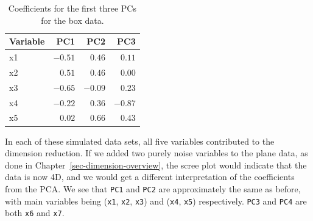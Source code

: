 \documentclass[
  letterpaper,
]{krantz}
\newenvironment{Shaded}{\begin{snugshade}}{\end{snugshade}}
\newcommand{\AttributeTok}[1]{\textcolor[rgb]{0.40,0.45,0.13}{#1}}
\newcommand{\ControlFlowTok}[1]{\textcolor[rgb]{0.00,0.23,0.31}{#1}}
\newcommand{\DecValTok}[1]{\textcolor[rgb]{0.68,0.00,0.00}{#1}}
\newcommand{\FunctionTok}[1]{\textcolor[rgb]{0.28,0.35,0.67}{#1}}
\newcommand{\NormalTok}[1]{\textcolor[rgb]{0.00,0.23,0.31}{#1}}
\newcommand{\OtherTok}[1]{\textcolor[rgb]{0.00,0.23,0.31}{#1}}
\newcommand{\SpecialCharTok}[1]{\textcolor[rgb]{0.37,0.37,0.37}{#1}}
\begin{document}
\hypertarget{tbl-box-pcs}{}
\begin{longtable}{lrrr}
\caption{\label{tbl-box-pcs}Coefficients for the first three PCs for the box data. }\tabularnewline

\toprule
Variable & PC1 & PC2 & PC3 \\ 
\midrule
x1 & $-0.51$ & $0.46$ & $0.11$ \\ 
x2 & $0.51$ & $0.46$ & $0.00$ \\ 
x3 & $-0.65$ & $-0.09$ & $0.23$ \\ 
x4 & $-0.22$ & $0.36$ & $-0.87$ \\ 
x5 & $0.02$ & $0.66$ & $0.43$ \\ 
\bottomrule
\end{longtable}

In each of these simulated data sets, all five variables contributed to
the dimension reduction. If we added two purely noise variables to the
plane data, as done in Chapter~\ref{sec-dimension-overview}, the scree
plot would indicate that the data is now 4D, and we would get a
different interpretation of the coefficients from the PCA. We see that
\texttt{PC1} and \texttt{PC2} are approximately the same as before, with
main variables being (\texttt{x1}, \texttt{x2}, \texttt{x3}) and
(\texttt{x4}, \texttt{x5}) respectively. \texttt{PC3} and \texttt{PC4}
are both \texttt{x6} and \texttt{x7}.

\begin{Shaded}
\end{Shaded}
\end{document}
